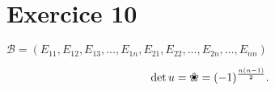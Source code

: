 \part{Exercice 10}

$\mathcal{B} = (E_{11}, E_{12}, E_{13}, \ldots, E_{1n}, E_{21}, E_{22}, \ldots, E_{2n}, \ldots, E_{nn})$

\begin{align*}
	\det u =\text{\ding{96}} = (-1)^{\frac{n(n-1)}{2}}.
\end{align*}


